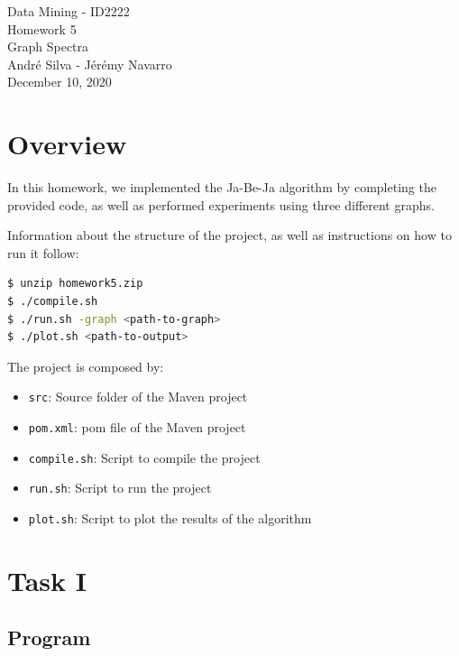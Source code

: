 \documentclass[]{article}
\begin{document}
\begin{center}
  {\large Data Mining - ID2222}\\
  \vspace{7mm}
  {\huge Homework 5\\[1ex]}
  {\Large  Graph Spectra  }\\
  \vspace{7mm}  
  {André Silva - Jérémy Navarro\\}
  \vspace{4mm}
  {\large December 10, 2020\\}
\end{center}

\section{Overview}

In this homework, we implemented the Ja-Be-Ja algorithm by completing the provided code, as well as performed experiments using three different graphs.

Information about the structure of the project, as well as instructions on how to run it follow:

\begin{lstlisting}[language=bash]
$ unzip homework5.zip
$ ./compile.sh
$ ./run.sh -graph <path-to-graph>
$ ./plot.sh <path-to-output>
\end{lstlisting}

The project is composed by:

\begin{itemize}
    \item \texttt{src}: Source folder of the Maven project
    \item \texttt{pom.xml}: pom file of the Maven project
    \item \texttt{compile.sh}: Script to compile the project
    \item \texttt{run.sh}: Script to run the project
    \item \texttt{plot.sh}: Script to plot the results of the algorithm
\end{itemize}

\section{Task I}

\subsection{Program}
\end{document}
